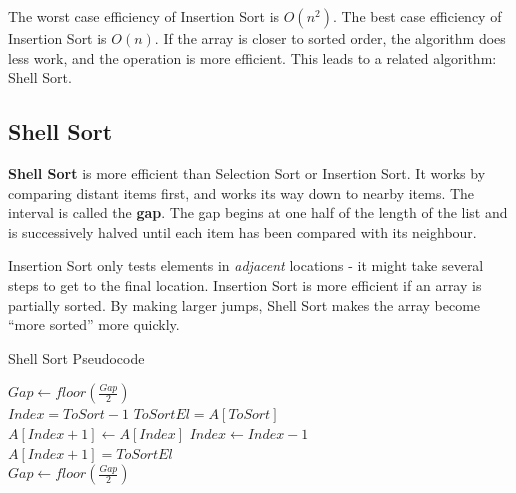 \documentclass[11pt]{article}
\begin{document}
The worst case efficiency of Insertion Sort is $O(n^2)$. 
The best case efficiency of Insertion Sort is $O(n)$. 
If the array is closer to sorted order, the algorithm does less work, and the operation is more efficient.
This leads to a related algorithm: Shell Sort.

\newpage
\subsection{Shell Sort}
\textbf{Shell Sort} is more efficient than Selection Sort or Insertion Sort. 
It works by comparing distant items first, and works its way down to nearby items. 
The interval is called the \textbf{gap}. 
The gap begins at one half of the length of the list and is successively halved until each item has been compared with its neighbour.

Insertion Sort only tests elements in \textit{adjacent} locations - it might take several steps to get to the final location. 
Insertion Sort is more efficient if an array is partially sorted.
By making larger jumps, Shell Sort makes the array become ``more sorted'' more quickly.

\begin{algorithm}
    \caption{Shell Sort Pseudocode}
    \begin{algorithmic}
         
         

            \State $Gap \gets floor(\frac{Gap}{2})$ 
            \\
                    \State $Index = ToSort -1$ 
                    \State $ToSortEl = A[ToSort]$ 
                    \\
                        \State $A[Index+1] \gets A[Index]$ 
                        \State $Index \gets Index - 1$
                    \EndWhile
                    \\ 
                    \State $A[Index+1] = ToSortEl$ 
                \EndFor
                \\ 
                \State $Gap \gets floor(\frac{Gap}{2})$
            \EndWhile
        \EndProcedure
    \end{algorithmic}
\end{algorithm}
\end{document}
